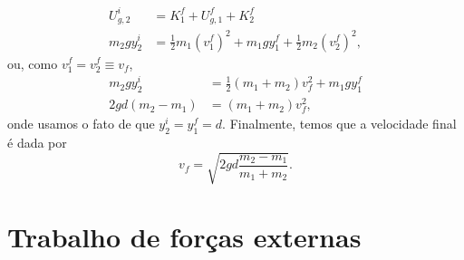%
\begin{align}
    U_{g, 2}^i &= K_1^f + U_{g, 1}^f + K_2^f \\
    m_2gy_2^i &= \frac{1}{2} m_1 (v_1^f)^2 + m_1gy_1^f + \frac{1}{2} m_2 (v_2^f)^2,
\end{align}
%
ou, como $v_1^f = v_2^f \equiv v_f$,
\begin{align}
    m_2gy_2^i &= \frac{1}{2} (m_1 + m_2) v_f^2 + m_1gy_1^f \\
    2gd(m_2-m_1) &= (m_1+m_2) v_f^2,
\end{align}
%
onde usamos o fato de que $y_2^i = y_1^f = d$. Finalmente, temos que a velocidade final é dada por
\begin{equation}
    v_f = \sqrt{2gd\frac{m_2-m_1}{m_1+m_2}}.
\end{equation}

\section{Trabalho de forças externas}
\label{Sec:TrabalhoForcasExternas}

